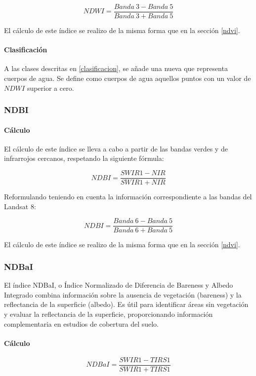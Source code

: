 $$NDWI = \frac{Banda~3-Banda~5}{Banda~3+Banda~5}$$

El cálculo de este índice se realizo de la misma forma que en la sección \ref{ndvi}.


\paragraph{Clasificación} 

A las clases descritas en \ref{clasificacion}, se añade una nueva que representa cuerpos de agua. Se define como cuerpos de agua aquellos puntos con un valor de $NDWI$ superior a cero.

\subsubsection{NDBI}

\paragraph{Cálculo}

El cálculo de este índice se lleva a cabo a partir de las bandas verdes y de infrarrojos cercanos, respetando la siguiente fórmula:

$$NDBI = \frac{SWIR1 - NIR}{SWIR1 + NIR}$$

Reformulando teniendo en cuenta la información correspondiente a las bandas del Landsat 8:

$$NDBI = \frac{Banda~6-Banda~5}{Banda~6+Banda~5}$$

El cálculo de este índice se realizo de la misma forma que en la sección \ref{ndvi}.

\subsubsection{NDBaI}

El índice NDBaI, o Índice Normalizado de Diferencia de Bareness y Albedo Integrado combina información sobre la ausencia de vegetación (bareness) y la reflectancia de la superficie (albedo). Es útil para identificar áreas sin vegetación y evaluar la reflectancia de la superficie, proporcionando información complementaria en estudios de cobertura del suelo.

\paragraph{Cálculo}

$$NDBaI=\frac{SWIR1-TIRS1}{SWIR1+TIRS1}$$

